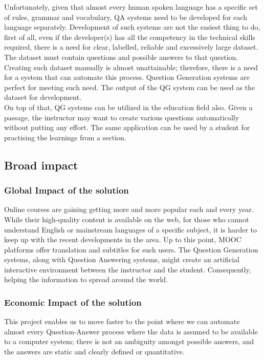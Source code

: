 \documentclass{mefsdp}
\begin{document}
	Unfortunately, given that almost every human spoken language has a specific set of rules, grammar and vocabulary, QA systems need to be developed for each language separately. Development of such systems are not the easiest thing to do, first of all, even if the developer(s) has all the competency in the technical skills required, there is a need for clear, labelled, reliable and excessively large dataset. The dataset must contain questions and possible answers to that question. Creating such dataset manually is almost unattainable; therefore, there is a need for a system that can automate this process. Question Generation systems are perfect for meeting such need. The output of the QG system can be used as the dataset for development.\\
	
	On top of that, QG systems can be utilized in the education field also. Given a passage, the instructor may want to create various questions automatically without putting any effort. The same application can be used by a student for practising the learnings from a section.
	
	
	\subsection{Broad impact}
	\subsubsection{Global Impact of the solution}
	Online courses are gaining getting more and more popular each and every year. While their high-quality content is available on the web, for those who cannot understand English or mainstream languages of a specific subject, it is harder to keep up with the recent developments in the area. Up to this point, MOOC platforms offer translation and subtitles for such users. The Question Generation systems, along with Question Answering systems, might create an artificial interactive environment between the instructor and the student. Consequently, helping the information to spread around the world.
	
	\subsubsection{Economic Impact of the solution}
	This project enables us to move faster to the point where we can automate almost every Question-Answer process where the data is assumed to be available to a computer system; there is not an ambiguity amongst possible answers, and the answers are static and clearly defined or quantitative.\\
	
\end{document}
